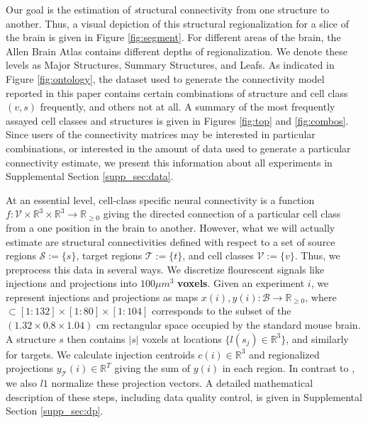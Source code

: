 Our goal is the estimation of {\textit structural connectivity} from one structure to another.
Thus, a visual depiction of this structural regionalization for a slice of the brain is given in Figure \ref{fig:segment}.
For different areas of the brain, the Allen Brain Atlas contains different depths of regionalization.
We denote these levels as Major Structures, Summary Structures, and Leafs.
As indicated in Figure \ref{fig:ontology}, the dataset used to generate the connectivity model reported in this paper contains certain combinations of structure and cell class $(v,s)$ frequently, and others not at all.
A summary of the most frequently assayed cell classes and structures is given in Figures \ref{fig:top} and \ref{fig:combos}.
Since users of the connectivity matrices may be interested in particular combinations, or interested in the amount of data used to generate a particular connectivity estimate, we present this information about all experiments in Supplemental Section \ref*{supp_sec:data}.

At an essential level, cell-class specific neural connectivity is a function $f:  \mathcal V \times \mathbb R^3 \times \mathbb R^3 \to \mathbb R_{\geq 0}$ giving the directed connection of a particular cell class from a one position in the brain to another.
However, what we will actually estimate are structural connectivities defined with respect to a set of source regions $\mathcal S := \{ s\} $, target regions $\mathcal T := \{ t \}$, and cell classes $\mathcal V := \{v\}$.
Thus, we preprocess this data in several ways.
We discretize flourescent signals like injections and projections into $100 \mu m^3$ \textbf{voxels}.
Given an experiment $i$, we represent injections and projections as maps $x(i),y(i) : \mathcal B \to \mathbb R_{\geq 0}$, where $\mathcal \subset [1:132] \times [1:80] \times [1:104]$ corresponds to the subset of the $(1.32 \times 0.8 \times 1.04)$ cm rectangular space occupied by the standard mouse brain.
A structure $s$ then contains $|s|$ voxels at locations $\{l(s_j) \in \mathbb R^3\}$, and similarly for targets.
We calculate injection centroids $c(i) \in \mathbb R^3$ and regionalized projections $y_{\mathcal T} (i) \in \mathbb R^{T} $ giving the sum of $y(i)$ in each region.
In contrast to \citet{Knox2019-ot}, we also $l1$ normalize these projection vectors.
A detailed mathematical description of these steps, including data quality control, is given in Supplemental Section \ref{supp_sec:dp}.

